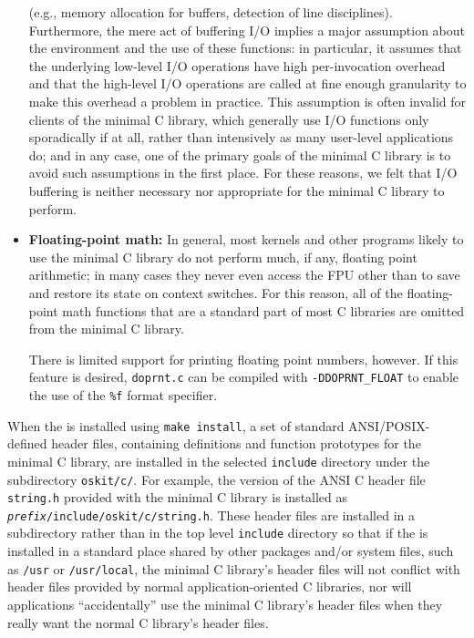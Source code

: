 \begin{itemize}
	(e.g., memory allocation for buffers, detection of line disciplines).
	Furthermore, 
	the mere act of buffering I/O implies
	a major assumption about the environment and the use of these functions:
	in particular,
	it assumes that the underlying low-level I/O operations
	have high per-invocation overhead
	and that the high-level I/O operations are called
	at fine enough granularity to make this overhead a problem in practice.
	This assumption is often invalid for clients of the minimal C library,
	which generally use I/O functions only sporadically if at all,
	rather than intensively as many user-level applications do;
	and in any case, one of the primary goals of the minimal C library
	is to avoid such assumptions in the first place.
	For these reasons,
	we felt that I/O buffering is neither necessary nor appropriate
	for the minimal C library to perform.
\item	{\bf Floating-point math:}
	In general, most kernels
	and other programs likely to use the minimal C library
	do not perform much, if any, floating point arithmetic;
	in many cases they never even access the FPU
	other than to save and restore its state on context switches.
	For this reason, all of the floating-point math functions
	that are a standard part of most C libraries
	are omitted from the minimal C library.

	There is limited support for printing floating
	point numbers, however.
	If this feature is desired,
	\texttt{doprnt.c} can be compiled with \texttt{-DDOPRNT_FLOAT}
	to enable the use of the \texttt{\%f} format specifier.
\end{itemize}


When the \oskit{} is installed using {\tt make install},
a set of standard ANSI/POSIX-defined header files,
containing definitions and function prototypes for the minimal C library,
are installed in the selected {\tt include} directory
under the subdirectory {\tt oskit/c/}.
For example, the version of the ANSI C header file {\tt string.h}
provided with the minimal C library
is installed as {\tt \emph{prefix}/include/oskit/c/string.h}.
These header files are installed in a subdirectory
rather than in the top level {\tt include} directory
so that if the \oskit{} is installed in a standard place
shared by other packages and/or system files,
such as {\tt /usr} or {\tt /usr/local},
the minimal C library's header files will not conflict
with header files provided by normal application-oriented C libraries,
nor will applications ``accidentally'' use the minimal C library's header files
when they really want the normal C library's header files.

